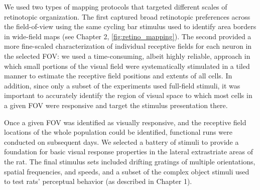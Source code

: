 We used two types of mapping protocols that targeted different scales of retinotopic organization. The first captured broad retinotopic preferences across the field-of-view using the same cycling bar stimulus used to identify area borders in wide-field maps (see Chapter 2, \ref{fig:retino_mapping}). The second provided a more fine-scaled characterization of individual receptive fields for each neuron in the selected FOV:  we used a time-consuming, albeit highly reliable, approach in which small portions of the visual field were systematically stimulated in a tiled manner to estimate the receptive field positions and extents of all cells. In addition, since only a subset of the experiments used full-field stimuli, it was important to accurately identify the region of visual space to which most cells in a given FOV were responsive and target the stimulus presentation there. 

Once a given FOV was identified as visually responsive, and the receptive field locations of the whole population could be identified, functional runs were conducted on subsequent days. We selected a battery of stimuli to provide a foundation for basic visual response properties in the lateral extrastriate areas of the rat. The final stimulus sets included drifting gratings of multiple orientations, spatial frequencies, and speeds, and a subset of the complex object stimuli used to test rats' perceptual behavior (as described in Chapter 1).


